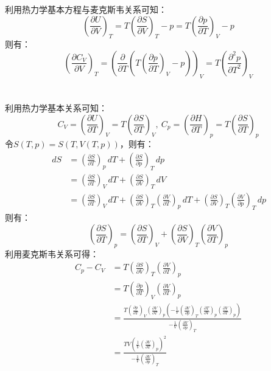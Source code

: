 \documentclass[a4paper,12pt]{article}
\begin{document}
利用热力学基本方程与麦克斯韦关系可知：
\begin{equation}\nonumber
	\left(\frac{\partial U}{\partial V}\right)_T=T\left(\frac{\partial S}{\partial V}\right)_T - p = T\left(\frac{\partial p}{\partial T}\right)_V - p
\end{equation}
则有：
\begin{equation}\nonumber
	\left(\frac{\partial C_V}{\partial V}\right)_T=\left(\frac{\partial }{\partial T}\left(T\left(\frac{\partial p}{\partial T}\right)_V - p\right)\right)_V = T\left(\frac{\partial^2p}{\partial T^2}\right)_V
\end{equation}

\section{}
利用热力学基本关系可知：
\begin{equation}\nonumber
	C_V=\left(\frac{\partial U}{\partial T}\right)_V = T\left(\frac{\partial S}{\partial T}\right)_V, ~ C_p=\left(\frac{\partial H}{\partial T}\right)_p = T\left(\frac{\partial S}{\partial T}\right)_p
\end{equation}
令$S(T,p)=S(T,V(T,p))$，则有：
\begin{equation}\nonumber
\begin{aligned}
	\,dS &= \left(\frac{\partial S}{\partial T}\right)_p\,dT + \left(\frac{\partial S}{\partial p}\right)_T\,dp\\
	&= \left(\frac{\partial S}{\partial T}\right)_V\,dT + \left(\frac{\partial S}{\partial V}\right)_T\,dV\\
	&=\left(\frac{\partial S}{\partial T}\right)_V\,dT + \left(\frac{\partial S}{\partial V}\right)_T\left(\frac{\partial V}{\partial T}\right)_p\,dT + \left(\frac{\partial S}{\partial V}\right)_T\left(\frac{\partial V}{\partial p}\right)_T\,dp
\end{aligned}
\end{equation}
则有：
\begin{equation}\nonumber
	\left(\frac{\partial S}{\partial T}\right)_p = \left(\frac{\partial S}{\partial T}\right)_V + \left(\frac{\partial S}{\partial V}\right)_T\left(\frac{\partial V}{\partial T}\right)_p
\end{equation}
利用麦克斯韦关系可得：
\begin{equation}\nonumber
\begin{aligned}
	C_p-C_V &= T\left(\frac{\partial S}{\partial V}\right)_T\left(\frac{\partial V}{\partial T}\right)_p \\
	&= T\left(\frac{\partial p}{\partial T}\right)_V\left(\frac{\partial V}{\partial T}\right)_p \\
	&= \frac{T\left(\frac{\partial p}{\partial T}\right)_V\left(\frac{\partial V}{\partial T}\right)_p\left(-\frac{1}{V}\left(\frac{\partial V}{\partial p}\right)_T\left(\frac{\partial T}{\partial V}\right)_p\left(\frac{\partial V}{\partial T}\right)_p\right)}{-\frac{1}{V}\left(\frac{\partial V}{\partial p}\right)_T} \\
	&= \frac{TV\left(\frac{1}{V}\left(\frac{\partial V}{\partial T}\right)_p\right)^2}{-\frac{1}{V}\left(\frac{\partial V}{\partial p}\right)_T}
\end{aligned}
\end{equation}
\end{document}
